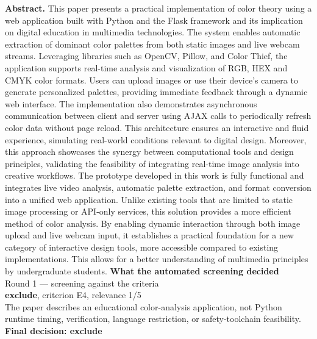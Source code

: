 \documentclass[11pt,a4paper]{article}
\begin{document}
{\small\textbf{Abstract.} This paper presents a practical implementation of color theory using a web application built with Python and the Flask framework and its implication on digital education in multimedia technologies. The system enables automatic extraction of dominant color palettes from both static images and live webcam streams. Leveraging libraries such as OpenCV, Pillow, and Color Thief, the application supports real-time analysis and visualization of RGB, HEX and CMYK color formats. Users can upload images or use their device's camera to generate personalized palettes, providing immediate feedback through a dynamic web interface. The implementation also demonstrates asynchronous communication between client and server using AJAX calls to periodically refresh color data without page reload. This architecture ensures an interactive and fluid experience, simulating real-world conditions relevant to digital design. Moreover, this approach showcases the synergy between computational tools and design principles, validating the feasibility of integrating real-time image analysis into creative workflows. The prototype developed in this work is fully functional and integrates live video analysis, automatic palette extraction, and format conversion into a unified web application. Unlike existing tools that are limited to static image processing or API-only services, this solution provides a more efficient method of color analysis. By enabling dynamic interaction through both image upload and live webcam input, it establishes a practical foundation for a new category of interactive design tools, more accessible compared to existing implementations. This allows for a better understanding of multimedia principles by undergraduate students.}
\vspace{3mm}
\vspace{2.5mm}
{\small\textbf{What the automated screening decided}}\\[2mm]
{\footnotesize\color{soft}Round 1 --- screening against the criteria}\\[0.5mm]
{\small\textbf{exclude}, criterion E4, relevance 1/5}\\[0.5mm]
{\small The paper describes an educational color-analysis application, not Python runtime timing, verification, language restriction, or safety-toolchain feasibility.}\\[2.5mm]
{\small\textbf{Final decision: exclude}}
\end{document}
